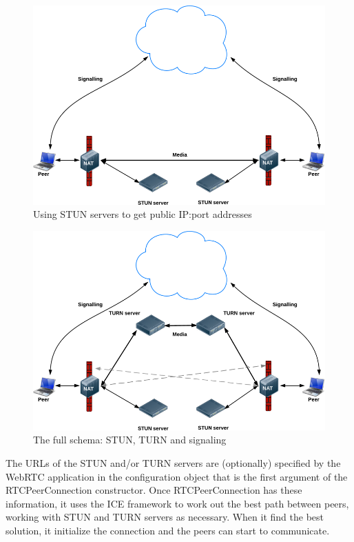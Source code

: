 \begin{figure}[ht]
  \centering
  \includegraphics[keepaspectratio=true, width=\textwidth]{images/stun}\caption{Using STUN servers to get public IP:port addresses}
  \label{fig:stun}
\end{figure}

\begin{figure}[ht]
  \centering
  \includegraphics[keepaspectratio=true, width=\textwidth]{images/turn}\caption{The full schema: STUN, TURN and signaling}
  \label{fig:turn}
\end{figure}

The URLs of the STUN and/or TURN servers are (optionally) specified by the WebRTC application in the configuration object that is the first argument of the RTCPeerConnection constructor. Once RTCPeerConnection has these information, it uses the ICE framework to work out the best path between peers, working with STUN and TURN servers as necessary. When it find the best solution, it initialize the connection and the peers can start to communicate.

